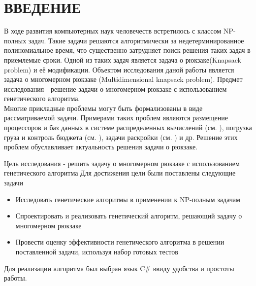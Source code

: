 \chapter*{ВВЕДЕНИЕ}
В ходе развития компьютерных наук человечеств встретилось с классом NP-полных задач. Такие задачи решаются алгоритмически за недетерминированное полиномиальное время, что существенно затрудняет поиск решения таких задач в приемлемые сроки.
 Одной из таких задач является задача о рюкзаке(Knapsack problem) и её модификации.
 Объектом исследования даной работы является задача о многомерном рюкзаке (Multidimensional knapsack problem).
 Предмет исследования - решение задачи о многомерном рюкзаке с использованием генетического алгоритма.
\\Многие прикладные проблемы могут быть формализованы в виде рассматриваемой задачи. Примерами таких проблем являются размещение процессоров
и баз данных в системе распределенных вычислений (см. \cite{Гэвиш1982}), погрузка груза и контроль бюджета (см. \cite{Ших1979}), задачи раскройки (см. \cite{Гилмор1966}) и др. 
Решение этих проблем обуславливает актуальность решения задачи о рюкзаке.

Цель исследования - решить задачу о многомерном рюкзаке с использованием генетического алгоритма
Для достижения цели были поставлены следующие задачи
\begin{itemize}
\item Исследовать генетические алгоритмы в применении к NP-полным задачам
\item Спроектировать и реализовать генетический алгоритм, решающий задачу о многомерном рюкзаке
\item Провести оценку эффективности генетического алгоритма в решении поставленной задачи, используя набор готовых тестов
\end{itemize} 
Для реализации алгоритма был выбран язык C\# ввиду удобства и простоты работы.
